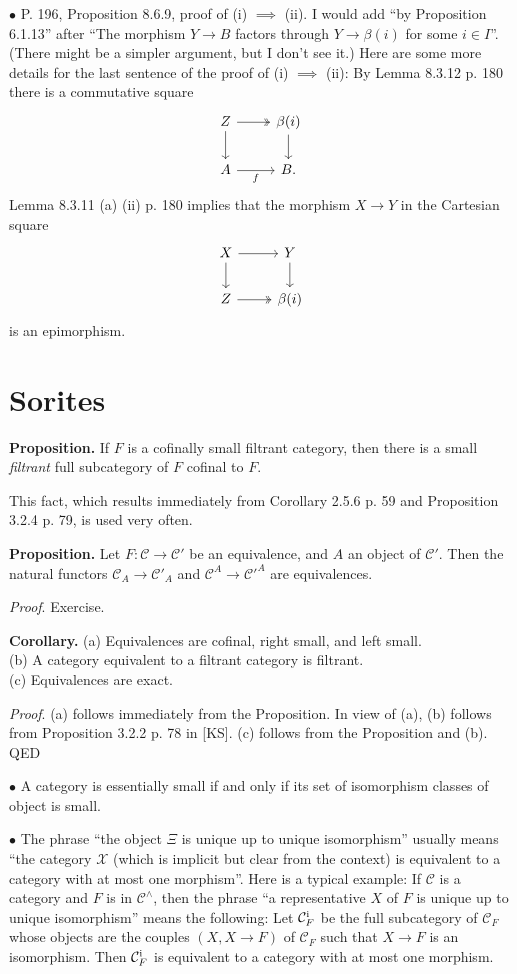 \documentclass[12pt]{article}
\theoremstyle{remark}
\newcommand{\bu}{\bullet}
\newcommand{\n}{\noindent}
\newcommand{\C}{\mathcal C}
\begin{document}

\n$\bu$ P. 196, Proposition 8.6.9, proof of (i) $\implies$ (ii). I would add ``by Proposition 6.1.13'' after ``The morphism $Y\to B$ factors through $Y\to\beta(i)$ for some $i\in I$''. (There might be a simpler argument, but I don't see it.) Here are some more details for the last sentence of the proof of (i) $\implies$ (ii): By Lemma 8.3.12 p. 180 there is a commutative square 
$$
\begin{tikzcd}
Z\ar[two heads]{r}\ar{d}&\beta(i)\ar{d}\\
A\ar{r}[swap]{f}&B.
\end{tikzcd}
$$
Lemma 8.3.11 (a) (ii) p. 180 implies that the morphism $X\to Y$ in the Cartesian square
$$
\begin{tikzcd}
X\ar{r}\ar{d}&Y\ar{d}\\
Z\ar[two heads]{r}&\beta(i) 
\end{tikzcd}
$$
is an epimorphism.
%
\section{Sorites}%
%
\textbf{Proposition.} If $F$ is a cofinally small filtrant category, then there is a small \emph{filtrant} full subcategory of $F$ cofinal to $F$. 

This fact, which results immediately from Corollary 2.5.6 p. 59 and Proposition 3.2.4 p. 79, is used very often.

\n\textbf{Proposition.} Let $F:\C\to\C'$ be an equivalence, and $A$ an object of $\C'$. Then the natural functors $\C_A\to\C'_A$ and $\C^A\to\C'^A$ are equivalences. 

\n\emph{Proof}. Exercise.

\n\textbf{Corollary.} (a) Equivalences are cofinal, right small, and left small.\\ (b) A category equivalent to a filtrant category is filtrant.\\ (c) Equivalences are exact. 

\n\emph{Proof}. (a) follows immediately from the Proposition. In view of (a), (b) follows from Proposition 3.2.2 p. 78 in [KS]. (c) follows from the Proposition and (b). QED

\n$\bu$ A category is essentially small if and only if its set of isomorphism classes of object is small.

\n$\bu$ The phrase ``the object $\Xi$ is unique up to unique isomorphism'' usually means ``the category $\mathcal X$ (which is implicit but clear from the context) is equivalent to a category with at most one morphism''. Here is a typical example: If $\C$ is a category and $F$ is in $\C^\wedge$, then the phrase ``a representative $X$ of $F$ is unique up to unique isomorphism'' means the following: Let $\C_F^{\text i}$ be the full subcategory of $\C_F$ whose objects are the couples $(X,X\to F)$ of $\C_F$ such that $X\to F$ is an isomorphism. Then $\C_F^{\text i}$ is equivalent to a category with at most one morphism.
\end{document}
